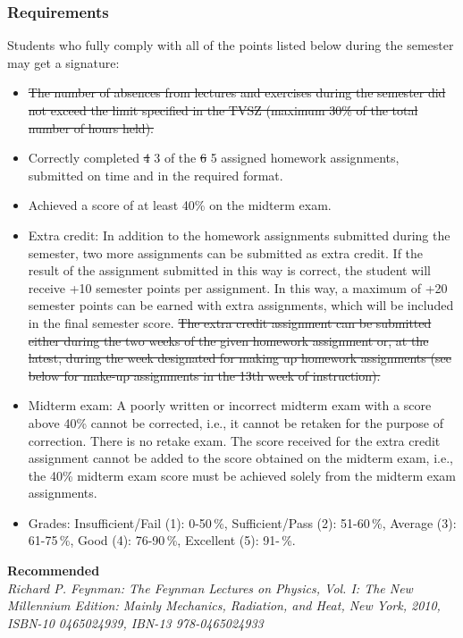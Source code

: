 \documentclass[t,aspectratio=169]{beamer}
\begin{document}
\begin{frame}
\frametitle{Requirements}
Students who fully comply with all of the points listed below during the semester may get a signature:
\begin{itemize}
\setlength{\parskip}{0pt}
\setlength{\itemsep}{0pt}
\item \st{The number of absences from lectures and exercises during the semester did not exceed the limit specified in the TVSZ (maximum 30\% of the total number of hours held).}
\item Correctly completed \st{4} 3 of the \st{6} 5 assigned homework assignments, submitted on time and in the required  format.
\item Achieved a score of at least 40\% on the midterm exam.
\item Extra credit: In addition to the homework assignments submitted during the semester, two more assignments can be submitted as extra credit. If the result of the assignment submitted in this way is correct, the student will receive +10 semester points per assignment. In this way, a maximum of +20 semester points can be earned with extra assignments, which will be included in the final semester score. \st{The extra credit assignment can be submitted either during the two weeks of the given homework assignment or, at the latest, during the week designated for making up homework assignments (see below for make-up assignments in the 13th week of instruction).}
 \pagebreak
\item Midterm exam: A poorly written or incorrect midterm exam with a score above 40\% cannot be corrected, i.e., it cannot be retaken for the purpose of correction. There is no retake exam. The score received for the extra credit assignment cannot be added to the score obtained on the midterm exam, i.e., the 40\% midterm exam score must be achieved solely from the midterm exam assignments.
\item Grades: Insufficient/Fail (1): 0-50\,\%, Sufficient/Pass (2): 51-60\,\%, Average (3): 61-75\,\%, Good (4): 76-90\,\%, Excellent (5): 91-\,\%.
\end{itemize}
\textbf{Recommended}\\
\textit{Richard P. Feynman: The Feynman Lectures on Physics, Vol. I: The New Millennium Edition: Mainly Mechanics, Radiation, and Heat, New York, 2010, ISBN-10 0465024939, IBN-13 978-0465024933}
\end{frame}

\end{document}
